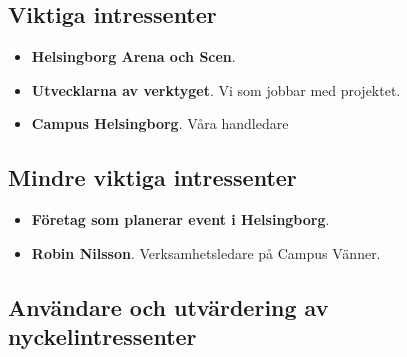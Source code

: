 \documentclass{article}
\begin{document}
    \subsection{Viktiga intressenter}
        \begin{itemize}
            \item \textbf{Helsingborg Arena och Scen}.
            \\
            \item \textbf{Utvecklarna av verktyget}. Vi som jobbar med projektet.
                \\
            \item \textbf{Campus Helsingborg}. Våra handledare
        \end{itemize}
        
    \subsection{Mindre viktiga intressenter}
    \begin{itemize}
            \item \textbf{Företag som planerar event i Helsingborg}.
                \\
            \item \textbf{Robin Nilsson}. Verksamhetsledare på Campus Vänner.
            
    \end{itemize}
    
    \subsection{Användare och utvärdering av nyckelintressenter}
    
\end{document}
